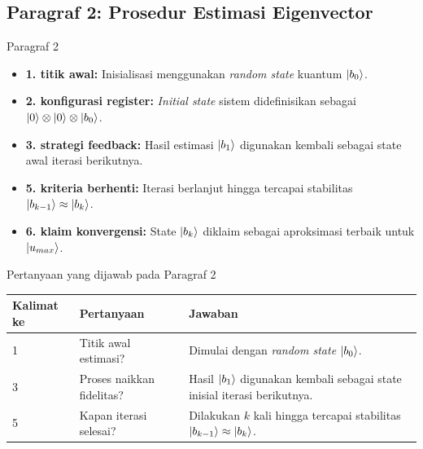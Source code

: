 \subsection{Paragraf 2: Prosedur Estimasi Eigenvector}
\begin{frame}{Paragraf 2}
    \begin{itemize}
        \item \textbf{1. titik awal:} Inisialisasi menggunakan \textit{random state} kuantum $\ket{b_0}$.
        \item \textbf{2. konfigurasi register:} \textit{Initial state} sistem didefinisikan sebagai $\ket{0} \otimes \ket{0} \otimes \ket{b_0}$.
        \item \textbf{3. strategi feedback:} Hasil estimasi $\ket{b_1}$ digunakan kembali sebagai state awal iterasi berikutnya.
        \item \textbf{5. kriteria berhenti:} Iterasi berlanjut hingga tercapai stabilitas $\ket{b_{k-1}} \approx \ket{b_k}$.
        \item \textbf{6. klaim konvergensi:} State $\ket{b_k}$ diklaim sebagai aproksimasi terbaik untuk $\ket{u_{max}}$.
    \end{itemize}
\end{frame}

\begin{frame}{Pertanyaan yang dijawab pada Paragraf 2}
    \centering
    \small
    \begin{tabular}{lp{4.5cm}p{6cm}}
        \toprule
        Kalimat ke & Pertanyaan & Jawaban \\
        \midrule
        1 & Titik awal estimasi? & Dimulai dengan \textit{random state} $\ket{b_0}$. \\
        3 & Proses naikkan fidelitas? & Hasil $\ket{b_1}$ digunakan kembali sebagai state inisial iterasi berikutnya. \\
        5 & Kapan iterasi selesai? & Dilakukan $k$ kali hingga tercapai stabilitas $\ket{b_{k-1}} \approx \ket{b_k}$. \\
        \bottomrule
    \end{tabular}
\end{frame}

